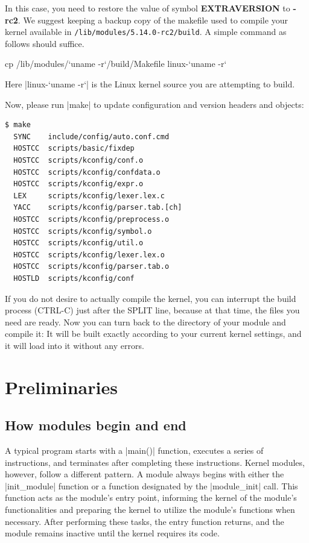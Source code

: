 \documentclass[10pt, oneside]{book}
\begin{document}
In this case, you need to restore the value of symbol \textbf{EXTRAVERSION} to \textbf{-rc2}.
We suggest keeping a backup copy of the makefile used to compile your kernel available in \verb|/lib/modules/5.14.0-rc2/build|.
A simple command as follows should suffice.
\begin{codebash}
cp /lib/modules/`uname -r`/build/Makefile linux-`uname -r`
\end{codebash}
Here \sh|linux-`uname -r`| is the Linux kernel source you are attempting to build.

Now, please run \sh|make| to update configuration and version headers and objects:

\begin{verbatim}
$ make
  SYNC    include/config/auto.conf.cmd
  HOSTCC  scripts/basic/fixdep
  HOSTCC  scripts/kconfig/conf.o
  HOSTCC  scripts/kconfig/confdata.o
  HOSTCC  scripts/kconfig/expr.o
  LEX     scripts/kconfig/lexer.lex.c
  YACC    scripts/kconfig/parser.tab.[ch]
  HOSTCC  scripts/kconfig/preprocess.o
  HOSTCC  scripts/kconfig/symbol.o
  HOSTCC  scripts/kconfig/util.o
  HOSTCC  scripts/kconfig/lexer.lex.o
  HOSTCC  scripts/kconfig/parser.tab.o
  HOSTLD  scripts/kconfig/conf
\end{verbatim}

If you do not desire to actually compile the kernel, you can interrupt the build process (CTRL-C) just after the SPLIT line, because at that time, the files you need are ready.
Now you can turn back to the directory of your module and compile it: It will be built exactly according to your current kernel settings, and it will load into it without any errors.

\section{Preliminaries}
\subsection{How modules begin and end}
\label{sec:module_init_exit}
A typical program starts with a \cpp|main()| function, executes a series of instructions,
and terminates after completing these instructions.
Kernel modules, however, follow a different pattern.
A module always begins with either the \cpp|init_module| function or a function designated by the \cpp|module_init| call.
This function acts as the module's entry point,
informing the kernel of the module's functionalities and preparing the kernel to utilize the module's functions when necessary.
After performing these tasks, the entry function returns, and the module remains inactive until the kernel requires its code.
\end{document}
